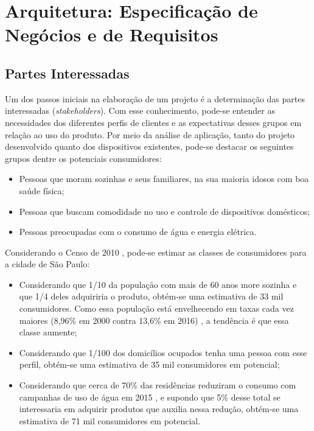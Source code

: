 \chapter{Arquitetura: Especificação de Negócios e de Requisitos}

\section{Partes Interessadas}
Um dos passos iniciais na elaboração de um projeto é a determinação das partes interessadas (\emph{stakeholders}). Com esse conhecimento, pode-se entender as necessidades dos diferentes perfis de clientes e as expectativas desses grupos em relação ao uso do produto. Por meio da análise de aplicação, tanto do projeto desenvolvido quanto dos dispositivos existentes, pode-se destacar os seguintes grupos dentre os potenciais consumidores:

\begin{itemize}
\item Pessoas que moram sozinhas e seus familiares, na sua maioria idosos com boa saúde física;
\item Pessoas que buscam comodidade no uso e controle de dispositivos domésticos;
\item Pessoas preocupadas com o consumo de água e energia elétrica.
\end{itemize}

Considerando o Censo de 2010 \cite{ibge}, pode-se estimar as classes de consumidores para a cidade de São Paulo:

\begin{itemize}
\item Considerando que 1/10 da população com mais de 60 anos more sozinha e que 1/4 deles adquiriria o produto, obtém-se uma estimativa de 33 mil consumidores. Como essa população está envelhecendo em taxas cada vez maiores (8,96\% em 2000 contra 13,6\% em 2016) \cite{bibliotecaVirtual}, a tendência é que essa classe aumente;
\item Considerando que 1/100 dos domicílios ocupados tenha uma pessoa com esse perfil, obtém-se uma estimativa de 35 mil consumidores em potencial;
\item Considerando que cerca de 70\% das residências reduziram o consumo com campanhas de uso de água em 2015 \cite{g1}, e supondo que 5\% desse total se interessaria em adquirir produtos que auxilia nessa redução, obtém-se uma estimativa de 71 mil consumidores em potencial.
\end{itemize}


